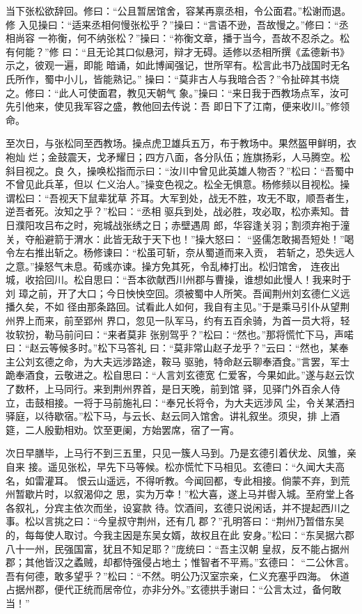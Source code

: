 当下张松欲辞回。修曰：“公且暂居馆舍，容某再禀丞相，令公面君。”松谢而退。修
入见操曰：“适来丞相何慢张松乎？”操曰：“言语不逊，吾故慢之。”修曰：“丞相尚容
一祢衡，何不纳张松？”操曰：“祢衡文章，播于当今，吾故不忍杀之。松有何能？”修
曰：“且无论其口似悬河，辩才无碍。适修以丞相所撰《孟德新书》示之，彼观一遍，即能
暗诵，如此博闻强记，世所罕有。松言此书乃战国时无名氏所作，蜀中小儿，皆能熟记。”
操曰：“莫非古人与我暗合否？”令扯碎其书烧之。修曰：“此人可使面君，教见天朝气
象。”操曰：“来日我于西教场点军，汝可先引他来，使见我军容之盛，教他回去传说：吾
即日下了江南，便来收川。”修领命。

至次日，与张松同至西教场。操点虎卫雄兵五万，布于教场中。果然盔甲鲜明，衣袍灿
烂；金鼓震天，戈矛耀日；四方八面，各分队伍；旌旗扬彩，人马腾空。松斜目视之。良
久，操唤松指而示曰：“汝川中曾见此英雄人物否？”松曰：“吾蜀中不曾见此兵革，但以
仁义治人。”操变色视之。松全无惧意。杨修频以目视松。操谓松曰：“吾视天下鼠辈犹草
芥耳。大军到处，战无不胜，攻无不取，顺吾者生，逆吾者死。汝知之乎？”松曰：“丞相
驱兵到处，战必胜，攻必取，松亦素知。昔日濮阳攻吕布之时，宛城战张绣之日；赤壁遇周
郎，华容逢关羽；割须弃袍于潼关，夺船避箭于渭水：此皆无敌于天下也！”操大怒曰：
“竖儒怎敢揭吾短处！”喝令左右推出斩之。杨修谏曰：“松虽可斩，奈从蜀道而来入贡，
若斩之，恐失远人之意。”操怒气未息。荀彧亦谏。操方免其死，令乱棒打出。松归馆舍，
连夜出城，收拾回川。松自思曰：“吾本欲献西川州郡与曹操，谁想如此慢人！我来时于刘
璋之前，开了大口；今日怏怏空回。须被蜀中人所笑。吾闻荆州刘玄德仁义远播久矣，不如
径由那条路回。试看此人如何，我自有主见。”于是乘马引仆从望荆州界上而来，前至郢州
界口，忽见一队军马，约有五百余骑，为首一员大将，轻妆软扮，勒马前问曰：“来者莫非
张别驾乎？”松曰：“然也。”那将慌忙下马，声喏曰：“赵云等候多时。”松下马答礼
曰：“莫非常山赵子龙乎？”云曰：“然也，某奉主公刘玄德之命，为大夫远涉路途，鞍马
驱驰，特命赵云聊奉酒食。”言罢，军士跪奉酒食，云敬进之。松自思曰：“人言刘玄德宽
仁爱客，今果如此。”遂与赵云饮了数杯，上马同行。来到荆州界首，是日天晚，前到馆
驿，见驿门外百余人侍立，击鼓相接。一将于马前施礼曰：“奉兄长将令，为大夫远涉风
尘，令关某洒扫驿庭，以待歇宿。”松下马，与云长、赵云同入馆舍。讲礼叙坐。须臾，排
上酒筵，二人殷勤相劝。饮至更阑，方始罢席，宿了一宵。

次日早膳毕，上马行不到三五里，只见一簇人马到。乃是玄德引着伏龙、凤雏，亲自来
接。遥见张松，早先下马等候。松亦慌忙下马相见。玄德曰：“久闻大夫高名，如雷灌耳。
恨云山遥远，不得听教。今闻回都，专此相接。倘蒙不弃，到荒州暂歇片时，以叙渴仰之
思，实为万幸！”松大喜，遂上马并辔入城。至府堂上各各叙礼，分宾主依次而坐，设宴款
待。饮酒间，玄德只说闲话，并不提起西川之事。松以言挑之曰：“今皇叔守荆州，还有几
郡？”孔明答曰：“荆州乃暂借东吴的，每每使人取讨。今我主因是东吴女婿，故权且在此
安身。”松曰：“东吴据六郡八十一州，民强国富，犹且不知足耶？”庞统曰：“吾主汉朝
皇叔，反不能占据州郡；其他皆汉之蟊贼，却都恃强侵占地土；惟智者不平焉。”玄德曰：
“二公休言。吾有何德，敢多望乎？”松曰：“不然。明公乃汉室宗亲，仁义充塞乎四海。
休道占据州郡，便代正统而居帝位，亦非分外。”玄德拱手谢曰：“公言太过，备何敢
当！”

